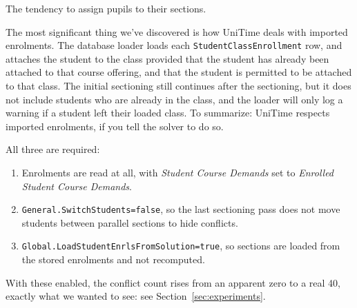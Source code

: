 The tendency to assign pupils to their sections.

The most significant thing we've discovered is how UniTime deals with imported enrolments.
The database loader loads each \texttt{StudentClassEnrollment} row, and attaches the student to the class provided that the student has already been attached to that course offering, and that the student is permitted to be attached to that class.
The initial sectioning still continues after the sectioning, but it does not include students who are already in the class, and the loader will only log a warning if a student left their loaded class.
To summarize: UniTime respects imported enrolments, if you tell the solver to do so.

All three are required:

\begin{enumerate}
  \item Enrolments are read at all, with \emph{Student Course Demands} set to \emph{Enrolled Student Course Demands}.
  \item \texttt{General.SwitchStudents=false}, so the last sectioning pass does not move students between parallel sections to hide conflicts.
  \item \texttt{Global.LoadStudentEnrlsFromSolution=true}, so sections are loaded from the stored enrolments and not recomputed.
\end{enumerate}

With these enabled, the conflict count rises from an apparent zero to a real 40, exactly what we wanted to see: see Section~\ref{sec:experiments}.
